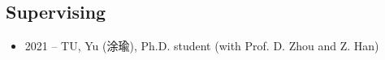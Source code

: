 \documentclass[10pt]{article}
\begin{document}
\subsection*{Supervising}
\begin{itemize}
\itemsep-0.5em 
\item 2021 -- TU, Yu (涂瑜), Ph.D. student (with Prof. D. Zhou and Z. Han)
\end{itemize}

\end{document}
